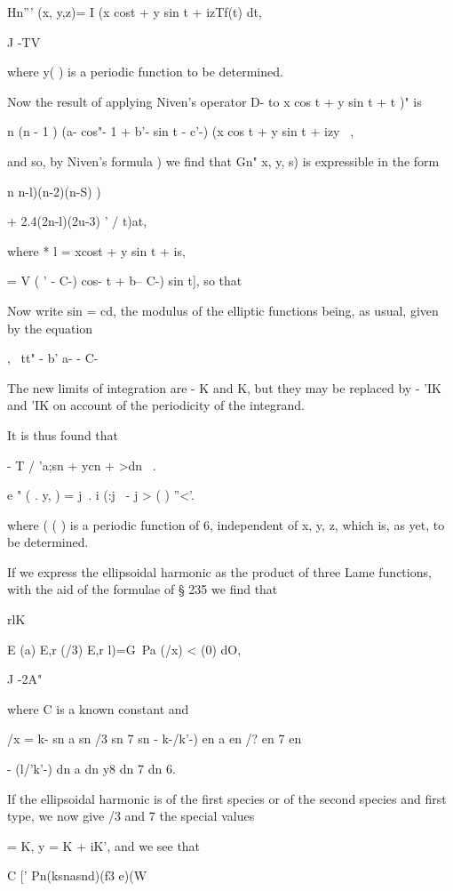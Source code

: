 {{{{{{{{Hn''' (x, y,z)= I (x cost + y sin t + izTf(t) dt,

J -TV

where y( ) is a periodic function to be determined.

Now the result of applying Niven's operator D- to x cos t + y sin t +
t )" is

n (n - 1 ) (a- cos"- 1 + b'- sin t - c'-) (x cos t + y sin t + izy ~,

and so, by Niven's formula ) we find that Gn" x, y, s) is
expressible in the form

n n-l)(n-2)(n-S) )

+ 2.4(2n-l)(2u-3) '  / t)at,

%
%

where * l = xcost + y sin t + is,

  = V ( ' - C-) cos- t + b-- C-) sin t], so that

Now write sin = cd, the modulus of the elliptic functions being, as
usual, given by the equation

, \ tt" - b' a- - C-

The new limits of integration are - K and K, but they may be replaced
by - 'IK and 'IK on account of the periodicity of the integrand.

It is thus found that

 - T / 'a;sn + ycn + >dn \ .

e " ( . y, ) = j\ . i (:j \ - j > ( ) ''<'.

where ( ( ) is a periodic function of 6, independent of x, y, z, which
is, as yet, to be determined.

If we express the ellipsoidal harmonic as the product of three Lame
functions, with the aid of the formulae of § 235 we find that

rlK

E (a) E,r (/3) E,r l)=G\ Pa (/x) < (0) dO,

J -2A"

where C is a known constant and

/x = k- sn a sn /3 sn 7 sn - k-/k'-) en a en /? en 7 en

- (l/'k'-) dn a dn y8 dn 7 dn 6.

If the ellipsoidal harmonic is of the first species or of the second
species and first type, we now give /3 and 7 the special values

  = K, y = K + iK', and we see that

C [' Pn(ksnasnd)(f3 e)(W

}}}}}}}}
